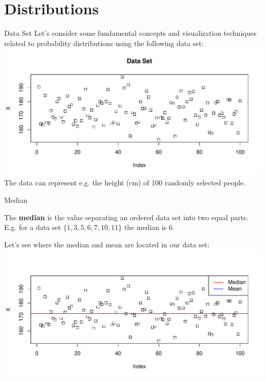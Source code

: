 \section{Distributions}

\begin{frame}{Data Set}
    Let's consider some fundamental concepts and visualization techniques related to probability distributions using the following data set:
    \includegraphics[width=\textwidth]{R/plots/distrib-data-set}
    The data can represent e.g. the height (cm) of 100 randomly selected people.

\end{frame}

\begin{frame}{Median}

    The \textbf{median} is the value separating an ordered data set into two equal parts. E.g. for a data set $\{1, 3, 5, 6, 7, 10, 11\}$ the median is 6.
    
    Let's see where the median and mean are located in our data set:
    \includegraphics[width=\textwidth]{R/plots/distrib-median-vs-mean}

\end{frame}

